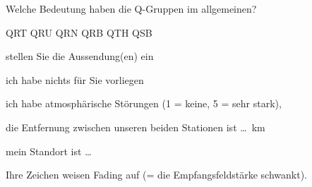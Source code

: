 \documentclass[avery5371,grid,frame,a4paper]{flashcards}
\newcommand{\card}[3]{
  \begin{flashcard}[{\chap} -- #1]{#2}#3\end{flashcard}
}
\begin{document}
\card{03c}{Welche Bedeutung haben die Q-Gruppen im allgemeinen?
  \begin{center}
    QRT \quad QRU \quad QRN \quad QRB \quad QTH \quad QSB
  \end{center}
}{\begin{description}\itemsep0pt
  \item[QRT] stellen Sie die Aussendung(en) ein
  \item[QRU] ich habe nichts für Sie vorliegen
  \item[QRN] ich habe atmosphärische Störungen (1 = keine, 5 = sehr stark),
  \item[QRB] die Entfernung zwischen unseren beiden Stationen ist \dots\ km
  \item[QTH] mein Standort ist \dots
  \item[QSB] Ihre Zeichen weisen Fading auf (= die Empfangsfeldstärke schwankt).
 \end{description}
}
\end{document}
